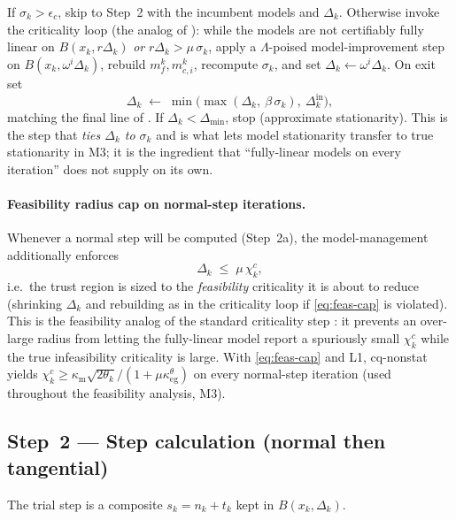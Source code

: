If $\sigma_k>\epsilon_c$, skip to Step~2 with the incumbent models and
$\Delta_k$. Otherwise invoke the criticality loop (the analog of
): while the models are not certifiably fully linear on
$B(x_k,r\Delta_k)$ \emph{or} $r\Delta_k>\mu\,\sigma_k$, apply a
$\Lambda$-poised model-improvement step on $B(x_k,\omega^{i}\Delta_k)$,
rebuild $m_f^k,m_{c,i}^k$, recompute $\sigma_k$, and set
$\Delta_k\leftarrow\omega^{i}\Delta_k$. On exit set
\begin{equation}
  \label{eq:crit-radius}
  \Delta_k \;\leftarrow\; \min\bigl(\max(\Delta_k,\ \beta\,\sigma_k),\ \Delta_k^{\text{in}}\bigr),
\end{equation}
matching the final line of . If $\Delta_k<\Delta_{\min}$,
stop (approximate stationarity). This is the step that \emph{ties $\Delta_k$ to
$\sigma_k$} and is what lets model stationarity transfer to true stationarity in
M3; it is the ingredient that ``fully-linear models on every iteration'' does not
supply on its own.

\paragraph{Feasibility radius cap on normal-step iterations.} Whenever a normal step
will be computed (Step~2a), the model-management additionally enforces
\begin{equation}
  \label{eq:feas-cap}
  \Delta_k \;\le\; \mu\,\chi_k^c ,
\end{equation}
i.e.\ the trust region is sized to the \emph{feasibility} criticality it is about to
reduce (shrinking $\Delta_k$ and rebuilding as in the criticality loop if
\eqref{eq:feas-cap} is violated). This is the feasibility analog of the standard
criticality step \citep[Ch.~10]{CSV2009}: it prevents an over-large radius from
letting the fully-linear model report a spuriously small $\chi_k^c$ while the true
infeasibility criticality is large. With \eqref{eq:feas-cap} and L1, cq-nonstat
yields $\chi_k^c\ge\kappa_{\mathrm m}\sqrt{2\theta_k}/(1+\mu\kappa_{\mathrm{eg}}^\theta)$
on every normal-step iteration (used throughout the feasibility analysis, M3).

\subsection{Step~2 --- Step calculation (normal then tangential)}
\label{sec:algo-step}

The trial step is a composite $s_k=n_k+t_k$ kept in $B(x_k,\Delta_k)$.

